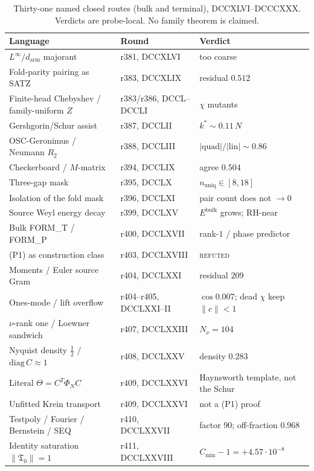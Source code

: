 \documentclass[11pt]{article}
\theoremstyle{remark}
\newcommand{\half}{\tfrac12}
\newcommand{\Tfrak}{\mathfrak{T}}
\begin{document}
\begin{table}[ht]
\centering
\caption{Thirty-one named closed routes (bulk and terminal),
DCCXLVI--DCCCXXX.  Verdicts are probe-local.  No family
theorem is claimed.}
\label{tab:closed}
{\small
\begin{tabular}{@{}llp{5.4cm}@{}}
\toprule
Language & Round & Verdict \\
\midrule
$L^{\infty}/d_{\mathrm{arm}}$ majorant
  & r381, DCCXLVI & too coarse \\
Fold-parity pairing as SATZ
  & r383, DCCXLIX & residual $0.512$ \\
Finite-head Chebyshev / family-uniform $Z$
  & r383/r386, DCCL--DCCLI & $\chi$ mutants \\
Gershgorin/Schur assist
  & r387, DCCLII & $k^{*}\sim0.11\,N$ \\
OSC-Geronimus / Neumann $R_{2}$
  & r388, DCCLIII & $|\mathrm{quad}|/|\mathrm{lin}|\sim0.86$ \\
Checkerboard / $M$-matrix
  & r394, DCCLIX & agree $0.504$ \\
Three-gap mask
  & r395, DCCLX & $n_{\mathrm{uniq}}\in[8,18]$ \\
Isolation of the fold mask
  & r396, DCCLXI & pair count does not $\to0$ \\
Source Weyl energy decay
  & r399, DCCLXV & $E^{\mathrm{bulk}}$ grows; RH-near \\
Bulk FORM\_T / FORM\_P
  & r400, DCCLXVII & rank-$1$ / phase predictor \\
(P1) as construction class
  & r403, DCCLXVIII & \textsc{refuted} \\
Moments / Euler source Gram
  & r404, DCCLXXI & residual $209$ \\
Ones-mode / lift overflow
  & r404--r405, DCCLXXI--II & $\cos0.007$; dead $\chi$ keep $\|c\|<1$ \\
$\nu$-rank one / Loewner sandwich
  & r407, DCCLXXIII & $N_{\nu}=104$ \\
Nyquist density $\half$ / $\mathrm{diag}\,C\approx1$
  & r408, DCCLXXV & density $0.283$ \\
Literal $\Theta=C^{T}\Phi_{N}C$
  & r409, DCCLXXVI & Haynsworth template, not the Schur \\
Unfitted Krein transport
  & r409, DCCLXXVI & not a (P1) proof \\
Testpoly / Fourier / Bernstein / SEQ
  & r410, DCCLXXVII & factor $90$; off-fraction $0.968$ \\
Identity saturation $\|\Tfrak_{0}\|=1$
  & r411, DCCLXXVIII & $C_{\min}-1=+4.57\cdot10^{-8}$ \\

\end{tabular}}
\end{table}
\end{document}
